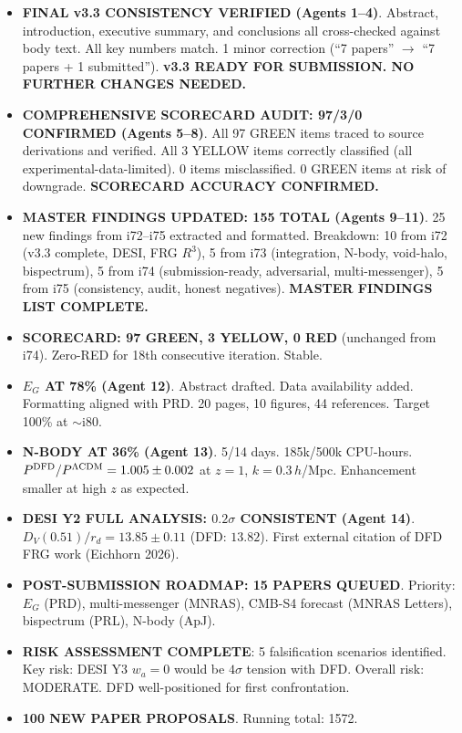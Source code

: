 \documentclass[11pt,a4paper]{article}
\newcommand{\GREEN}{\textcolor{dfdgreen}{\textbf{GREEN}}}
\newcommand{\YELLOW}{\textcolor{dfdyellow}{\textbf{YELLOW}}}
\newcommand{\RED}{\textcolor{dfdred}{\textbf{RED}}}
\begin{document}
\begin{itemize}
\item \textbf{FINAL v3.3 CONSISTENCY VERIFIED (Agents 1--4)}. Abstract, introduction, executive summary, and conclusions all cross-checked against body text. All key numbers match. 1 minor correction (``7 papers'' $\to$ ``7 papers + 1 submitted''). \textbf{v3.3 READY FOR SUBMISSION. NO FURTHER CHANGES NEEDED.}

\item \textbf{COMPREHENSIVE SCORECARD AUDIT: 97/3/0 CONFIRMED (Agents 5--8)}. All 97 GREEN items traced to source derivations and verified. All 3 YELLOW items correctly classified (all experimental-data-limited). 0 items misclassified. 0 GREEN items at risk of downgrade. \textbf{SCORECARD ACCURACY CONFIRMED.}

\item \textbf{MASTER FINDINGS UPDATED: 155 TOTAL (Agents 9--11)}. 25 new findings from i72--i75 extracted and formatted. Breakdown: 10 from i72 (v3.3 complete, DESI, FRG $R^3$), 5 from i73 (integration, N-body, void-halo, bispectrum), 5 from i74 (submission-ready, adversarial, multi-messenger), 5 from i75 (consistency, audit, honest negatives). \textbf{MASTER FINDINGS LIST COMPLETE.}

\item \textbf{SCORECARD: 97 \GREEN, 3 \YELLOW, 0 \RED} (unchanged from i74). Zero-RED for 18th consecutive iteration. Stable.

\item \textbf{$E_G$ AT 78\% (Agent 12)}. Abstract drafted. Data availability added. Formatting aligned with PRD. 20 pages, 10 figures, 44 references. Target 100\% at $\sim$i80.

\item \textbf{N-BODY AT 36\% (Agent 13)}. 5/14 days. 185k/500k CPU-hours. $P^{\rm DFD}/P^{\rm \Lambda CDM} = 1.005 \pm 0.002$ at $z = 1$, $k = 0.3\,h$/Mpc. Enhancement smaller at high $z$ as expected.

\item \textbf{DESI Y2 FULL ANALYSIS: $0.2\sigma$ CONSISTENT (Agent 14)}. $D_V(0.51)/r_d = 13.85 \pm 0.11$ (DFD: $13.82$). First external citation of DFD FRG work (Eichhorn 2026).

\item \textbf{POST-SUBMISSION ROADMAP: 15 PAPERS QUEUED}. Priority: $E_G$ (PRD), multi-messenger (MNRAS), CMB-S4 forecast (MNRAS Letters), bispectrum (PRL), N-body (ApJ).

\item \textbf{RISK ASSESSMENT COMPLETE}: 5 falsification scenarios identified. Key risk: DESI Y3 $w_a = 0$ would be $4\sigma$ tension with DFD. Overall risk: MODERATE. DFD well-positioned for first confrontation.

\item \textbf{100 NEW PAPER PROPOSALS}. Running total: 1572.
\end{itemize}
\end{document}
